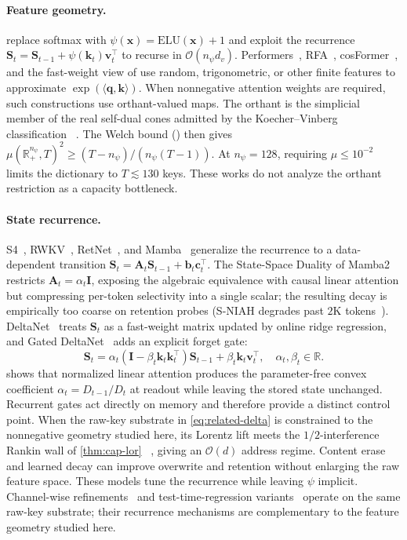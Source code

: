 \documentclass{article}
\newcommand{\1}{\bm{1}}
\newcommand{\lrangle}[1]{\langle#1\rangle}
\def\vb{{\bm{b}}}
\def\vc{{\bm{c}}}
\def\vk{{\bm{k}}}
\def\vq{{\bm{q}}}
\def\vv{{\bm{v}}}
\def\vx{{\bm{x}}}
\def\mA{{\bm{A}}}
\def\mI{{\bm{I}}}
\def\mS{{\bm{S}}}
\def\gO{{\mathcal{O}}}
\newcommand{\R}{\mathbb{R}}
\newcommand{\seql}{T}
\theoremstyle{definition}
\begin{document}
\paragraph{Feature geometry.} \citet{katharopoulos20transformers} replace softmax with
$\psi(\vx)=\mathrm{ELU}(\vx)+1$ and exploit the recurrence
$\mS_t=\mS_{t-1}+\psi(\vk_t)\vv_t^\top$ to recurse in $\gO(n_\psi d_v)$.
Performers~\citep{choromanski21performers}, RFA~\citep{peng21rfa}, cosFormer~\citep{qin22cosformer},
and the fast-weight view of \citet{schlag21linear} use random, trigonometric, or other finite
features to approximate $\exp(\lrangle{\vq,\vk})$. When nonnegative attention weights are required,
such constructions use orthant-valued maps. The orthant is the simplicial member of the real
self-dual cones admitted by the Koecher--Vinberg classification
~\citep{koecher57positivitatsbereiche,vinberg63homogeneous,faraut94analysis}. The Welch bound
() then gives
$\mu(\R_+^{n_\psi},\seql)^2\ge(\seql-n_\psi)/(n_\psi(\seql-1))$. At $n_\psi=128$, requiring
$\mu\le10^{-2}$ limits the dictionary to $\seql\lesssim130$ keys. These works do not analyze the
orthant restriction as a capacity bottleneck.

\paragraph{State recurrence.} S4~\citep{gu22efficiently}, RWKV~\citep{peng23rwkv}, RetNet~\citep{sun23retentive}, and
Mamba~\citep{gu24mamba} generalize the recurrence to a data-dependent transition
$\mS_t=\mA_t\mS_{t-1}+\vb_t\vc_t^\top$. The State-Space Duality of Mamba2~\citep{dao24mamba2}
restricts $\mA_t=\alpha_t\mI$, exposing the algebraic equivalence with causal linear attention but
compressing per-token selectivity into a single scalar; the resulting decay is empirically too
coarse on retention probes (S-NIAH degrades past $2$K tokens~\citep{yang25gateddeltanet}).
DeltaNet~\citep{yang24deltanet} treats $\mS_t$ as a fast-weight matrix updated by online ridge
regression, and Gated DeltaNet~\citep{yang25gateddeltanet} adds an explicit forget gate:
\begin{equation}
  \mS_t = \alpha_t(\mI-\beta_t\vk_t\vk_t^\top)\mS_{t-1} + \beta_t\vk_t\vv_t^\top,
  \quad \alpha_t,\beta_t\in\R.
  \label{eq:related-delta}
\end{equation}
 shows that normalized linear attention produces the parameter-free convex
coefficient $\alpha_t=D_{t-1}/D_t$ at readout while leaving the stored state unchanged. Recurrent
gates act directly on memory and therefore provide a distinct control point. When the raw-key
substrate in \cref{eq:related-delta} is constrained to the nonnegative geometry studied here, its
Lorentz lift meets the $1/2$-interference Rankin wall of \cref{thm:cap-lor}
~\citep{rankin55closest}, giving an $\gO(d)$ address regime. Content erase and learned decay can
improve overwrite and retention without enlarging the raw feature space. These models tune the
recurrence while leaving $\psi$ implicit. Channel-wise refinements~\citep{qiu25gated} and
test-time-regression variants~\citep{behrouz24titans,zuo25localla} operate on the same raw-key
substrate; their recurrence mechanisms are complementary to the feature geometry studied here.
\end{document}
